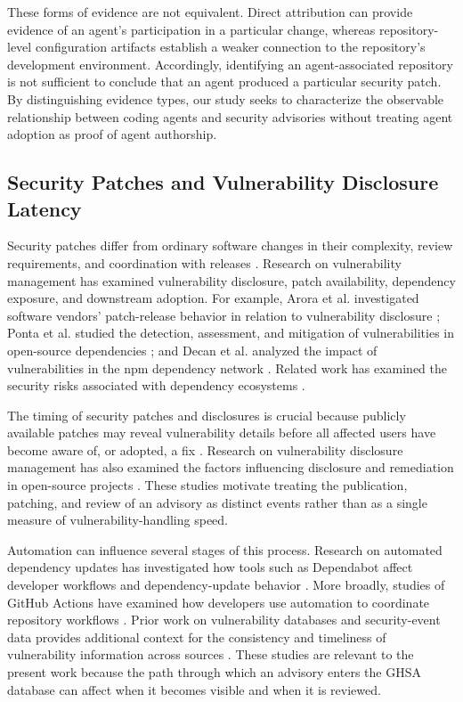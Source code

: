 \documentclass[smallextended,natbib]{svjour3}
\begin{document}
These forms of evidence are not equivalent. Direct attribution can provide
evidence of an agent's participation in a particular change, whereas
repository-level configuration artifacts establish a weaker connection to
the repository's development environment. Accordingly, identifying an
agent-associated repository is not sufficient to conclude that an agent
produced a particular security patch. By distinguishing evidence types, our
study seeks to characterize the observable relationship between coding
agents and security advisories without treating agent adoption as proof of
agent authorship.

\subsection{Security Patches and Vulnerability Disclosure Latency}

Security patches differ from ordinary software changes in their complexity,
review requirements, and coordination with releases
\citep{li2017large}. Research on vulnerability management has examined
vulnerability disclosure, patch availability, dependency exposure, and
downstream adoption. For example, Arora et al. investigated software vendors'
patch-release behavior in relation to vulnerability disclosure
\citep{arora2010empirical}; Ponta et al. studied the detection, assessment,
and mitigation of vulnerabilities in open-source dependencies
\citep{ponta2020detection}; and Decan et al. analyzed the impact of
vulnerabilities in the npm dependency network
\citep{decan2018impact}. Related work has examined the security risks
associated with dependency ecosystems
\citep{zimmermann2019small}.

The timing of security patches and disclosures is crucial because
publicly available patches may reveal vulnerability details before all
affected users have become aware of, or adopted, a fix
\citep{wang2017characterizing}. Research on vulnerability disclosure
management has also examined the factors influencing disclosure and
remediation in open-source projects
\citep{liu2025empirical}. These studies motivate treating the publication,
patching, and review of an advisory as distinct events rather than as a
single measure of vulnerability-handling speed.

Automation can influence several stages of this process. Research on
automated dependency updates has investigated how tools such as Dependabot
affect developer workflows and dependency-update behavior
\citep{mirhosseini2017can,he2023automating}. More broadly, studies of
GitHub Actions have examined how developers use automation to coordinate
repository workflows \citep{kinsman2021software}. Prior work on vulnerability
databases and security-event data provides additional context for the
consistency and timeliness of vulnerability information across sources
\citep{bozorgi2010beyond,allodi2017security}. These studies are relevant to
the present work because the path through which an advisory enters the GHSA
database can affect when it becomes visible and when it is reviewed.
\end{document}
